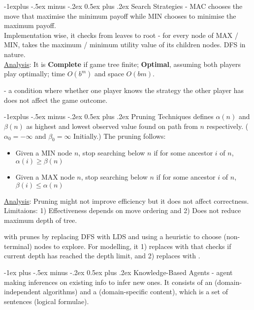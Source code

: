 \documentclass[10pt,landscape,letterpaper]{article}
\makeatletter
\renewcommand{\section}{\@startsection{section}{1}{0mm}%
                                {-1ex plus -.5ex minus -.2ex}%
                                {0.5ex plus .2ex}%
                                {\sffamily\large}}
\renewcommand{\subsection}{\@startsection{subsection}{2}{0mm}%
                                {-1explus -.5ex minus -.2ex}%
                                {0.5ex plus .2ex}%
                                {\sffamily\normalsize\itshape}}
\makeatother
\begin{document}
\begin{multicols}{3}
\subsection{Search Strategies}
 - MAC chooses the move that maximise the minimum payoff while MIN chooses to minimise the maximum payoff.
\\
Implementation wise, it checks from leaves to root - for every node of MAX / MIN, takes the maximum / minimum utility value of its children nodes. DFS in nature.
\\
\underline{Analysis}: It is \textbf{Complete} if game tree finite; \textbf{Optimal}, assuming both players play optimally; time $O(b^m)$ and space $O(bm)$.

\smallskip

 - a condition where whether one player knows the strategy the other player has does not affect the game outcome.


\subsection{Pruning Techniques}
 defines $\alpha(n)$ and $\beta(n)$ as highest and lowest observed value found on path from $n$ respectively. ($\alpha_0 = -\infty$ and $\beta_0 = \infty$ Initially.) The pruning follows:
\begin{itemize}
    \item Given a MIN node $n$, stop searching below $n$ if for some ancestor $i$ of $n$, $\alpha(i) \ge \beta(n)$
    \item Given a MAX node $n$, stop searching below $n$ if for some ancestor $i$ of $n$, $\beta(i) \le \alpha(n)$
\end{itemize}
\underline{Analysis}: Pruning might not improve efficiency but it does not affect correctness. Limitaions: 1) Effectiveness depends on move ordering and 2) Does not reduce maximum depth of tree.

\smallskip

 with  prunes by replacing DFS with LDS and using a heuristic to choose (non-terminal) nodes to explore. For modelling, it 1) replaces  with  that checks if current depth has reached the depth limit, and 2) replaces  with .




\section{Knowledge-Based Agents}
 - agent making inferences on existing info to infer new ones. It consists of an  (domain-independent algorithms) and a  (domain-specific content), which is a set of sentences (logical formulae).


\end{multicols}
\end{document}
